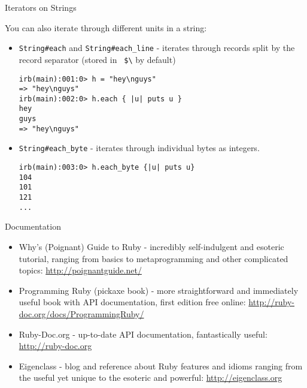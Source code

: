 \documentclass{slides}
\newcommand{\sh}[1]{
	{\Large #1}
	
}
\newcommand{\subh}[1]{
	{\large #1}
	
}
\begin{document}
\begin{slide}
\subh{Iterators on Strings}
You can also iterate through different units in a string:
\begin{itemize}
\item \verb|String#each| and \verb|String#each_line| - iterates through records split by the record separator (stored in \verb| $\| by default)
\begin{verbatim}
irb(main):001:0> h = "hey\nguys"
=> "hey\nguys"
irb(main):002:0> h.each { |u| puts u }
hey
guys
=> "hey\nguys"
\end{verbatim}
\item \verb|String#each_byte| - iterates through individual bytes as integers.
\begin{verbatim}
irb(main):003:0> h.each_byte {|u| puts u}
104
101
121
...
\end{verbatim}
\end{itemize}
\end{slide}


\begin{slide}
\sh{Documentation}
\begin{itemize}
\item Why's (Poignant) Guide to Ruby - incredibly self-indulgent and esoteric tutorial, ranging from basics to metaprogramming and other complicated topics: \url{http://poignantguide.net/}
\item Programming Ruby (pickaxe book) - more straightforward and immediately useful book with API documentation, first edition free online: \url{http://ruby-doc.org/docs/ProgrammingRuby/}
\item Ruby-Doc.org - up-to-date API documentation, fantastically useful: \url{http://ruby-doc.org}
\item Eigenclass - blog and reference about Ruby features and idioms ranging from the useful yet unique to the esoteric and powerful: \url{http://eigenclass.org}
\end{itemize}
\end{slide}
\end{document}
